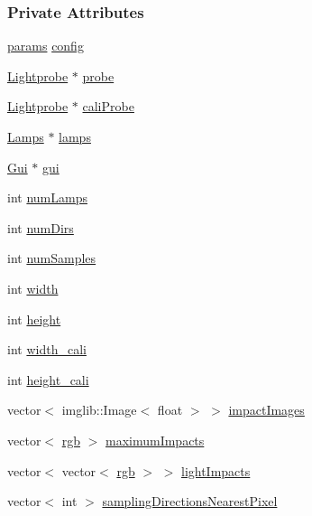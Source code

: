 \subsubsection*{\-Private \-Attributes}
\begin{DoxyCompactItemize}
\item 
\hyperlink{structTransfer_1_1params}{params} \hyperlink{classTransfer_a9a0f847440cf53c645b3d50559b485a8}{config}
\item 
\hyperlink{classLightprobe}{\-Lightprobe} $\ast$ \hyperlink{classTransfer_ad9ab5c7f95100f377362665d6bd3f103}{probe}
\item 
\hyperlink{classLightprobe}{\-Lightprobe} $\ast$ \hyperlink{classTransfer_a937a2a3065786c52eab75b378eb6e78d}{cali\-Probe}
\item 
\hyperlink{classLamps}{\-Lamps} $\ast$ \hyperlink{classTransfer_a0d396e5e74398e0f2b5e2bc4d89fc4a3}{lamps}
\item 
\hyperlink{classGui}{\-Gui} $\ast$ \hyperlink{classTransfer_a6a8196c2aa253624abc70424e943be1e}{gui}
\item 
int \hyperlink{classTransfer_a597d5f57239ced3ef7e4d8047eb1f94b}{num\-Lamps}
\item 
int \hyperlink{classTransfer_ae923e88292d589470b46c7d954148b12}{num\-Dirs}
\item 
int \hyperlink{classTransfer_a0101f5fe150a942d46136a85043b409b}{num\-Samples}
\item 
int \hyperlink{classTransfer_a3f5735e8e7dd83dd4947472f68dea2a3}{width}
\item 
int \hyperlink{classTransfer_a568f5b62be7951c9190526388f182255}{height}
\item 
int \hyperlink{classTransfer_ad0a21f131888045697ccbbe5ff2d127e}{width\-\_\-cali}
\item 
int \hyperlink{classTransfer_aaca098b491eb58acbdcae29848e62929}{height\-\_\-cali}
\item 
vector$<$ imglib\-::\-Image$<$ float $>$ $>$ \hyperlink{classTransfer_a28cd758cc5e3199a5db8f33bfcf13a2e}{impact\-Images}
\item 
vector$<$ \hyperlink{structrgb}{rgb} $>$ \hyperlink{classTransfer_a6be0abe305f0b461bf746eaa0ff452c9}{maximum\-Impacts}
\item 
vector$<$ vector$<$ \hyperlink{structrgb}{rgb} $>$ $>$ \hyperlink{classTransfer_ae567a873c8ea4685cfa1beeae2790ded}{light\-Impacts}
\item 
vector$<$ int $>$ \hyperlink{classTransfer_a1ea5a5523f5524962454d80a6c4c0a91}{sampling\-Directions\-Nearest\-Pixel}
\item 

\end{DoxyCompactItemize}
